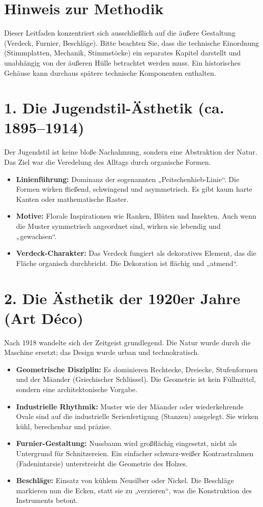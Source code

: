 \documentclass[11pt,a4paper]{article}
\begin{document}
\hbmaketitle
	
	\section*{Hinweis zur Methodik}
	Dieser Leitfaden konzentriert sich ausschließlich auf die äußere Gestaltung (Verdeck, Furnier, Beschläge). Bitte beachten Sie, dass die technische Einordnung (Stimmplatten, Mechanik, Stimmstöcke) ein separates Kapitel darstellt und unabhängig von der äußeren Hülle betrachtet werden muss. Ein historisches Gehäuse kann durchaus spätere technische Komponenten enthalten.
	
	\section*{1. Die Jugendstil-Ästhetik (ca. 1895–1914)}
	Der Jugendstil ist keine bloße Nachahmung, sondern eine Abstraktion der Natur. Das Ziel war die Veredelung des Alltags durch organische Formen.
	
	\begin{itemize}
		\item \textbf{Linienführung:} Dominanz der sogenannten „Peitschenhieb-Linie“. Die Formen wirken fließend, schwingend und asymmetrisch. Es gibt kaum harte Kanten oder mathematische Raster.
		\item \textbf{Motive:} Florale Inspirationen wie Ranken, Blüten und Insekten. Auch wenn die Muster symmetrisch angeordnet sind, wirken sie lebendig und „gewachsen“.
		\item \textbf{Verdeck-Charakter:} Das Verdeck fungiert als dekoratives Element, das die Fläche organisch durchbricht. Die Dekoration ist flächig und „atmend“.
	\end{itemize}
	
	\section*{2. Die Ästhetik der 1920er Jahre (Art Déco)}
	Nach 1918 wandelte sich der Zeitgeist grundlegend. Die Natur wurde durch die Maschine ersetzt; das Design wurde urban und technokratisch.
	
	\begin{itemize}
		\item \textbf{Geometrische Disziplin:} Es dominieren Rechtecke, Dreiecke, Stufenformen und der Mäander (Griechischer Schlüssel). Die Geometrie ist kein Füllmittel, sondern eine architektonische Vorgabe.
		\item \textbf{Industrielle Rhythmik:} Muster wie der Mäander oder wiederkehrende Ovale sind auf die industrielle Serienfertigung (Stanzen) ausgelegt. Sie wirken kühl, berechenbar und präzise.
		\item \textbf{Furnier-Gestaltung:} Nussbaum wird großflächig eingesetzt, nicht als Untergrund für Schnitzereien. Ein einfacher schwarz-weißer Kontrastrahmen (Fadenintarsie) unterstreicht die Geometrie des Holzes.
		\item \textbf{Beschläge:} Einsatz von kühlem Neusilber oder Nickel. Die Beschläge markieren nun die Ecken, statt sie zu „verzieren“, was die Konstruktion des Instruments betont.
	\end{itemize}
	
\end{document}
